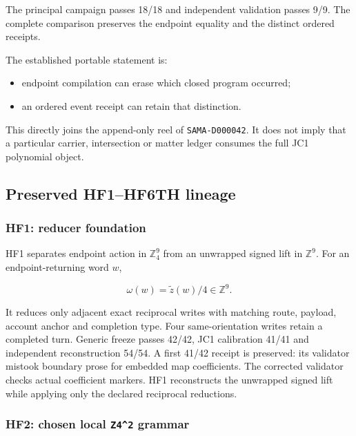The principal campaign passes 18/18 and independent validation passes
9/9. The complete comparison preserves the endpoint equality and the distinct ordered receipts.

The established portable statement is:

\begin{itemize}
\tightlist
\item
  endpoint compilation can erase which closed program occurred;
\item
  an ordered event receipt can retain that distinction.
\end{itemize}

This directly joins the append-only reel of \texttt{SAMA-D000042}. It
does not imply that a particular carrier, intersection or matter ledger
consumes the full JC1 polynomial object.

\subsection{Preserved HF1--HF6TH
lineage}\label{viii-ch11-preserved-hf1hf6th-lineage}

\subsubsection{HF1: reducer foundation}\label{viii-ch11-hf1-reducer-foundation}

HF1 separates endpoint action in \(\mathbb Z_4^9\) from an unwrapped
signed lift in \(\mathbb Z^9\). For an endpoint-returning word \(w\),

\[
\omega(w)=\widetilde z(w)/4\in\mathbb Z^9.
\]

It reduces only adjacent exact reciprocal writes with matching route,
payload, account anchor and completion type. Four same-orientation
writes retain a completed turn. Generic freeze passes 42/42, JC1
calibration 41/41 and independent reconstruction 54/54. A first 41/42
receipt is preserved: its validator mistook boundary prose for embedded
map coefficients. The corrected validator checks actual coefficient
markers. HF1 reconstructs the unwrapped signed lift while applying only the declared reciprocal reductions.

\subsubsection{\texorpdfstring{HF2: chosen local \texttt{Z4\^{}2}
grammar}{HF2: chosen local Z4\^{}2 grammar}}\label{viii-ch11-hf2-chosen-local-z42-grammar}

